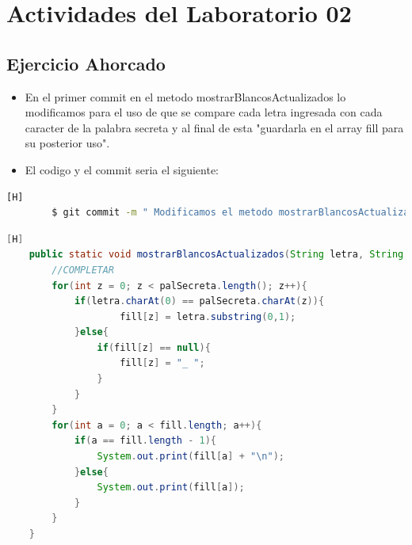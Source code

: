 \documentclass{article}
\begin{document}
	\section{Actividades del Laboratorio 02}
	
	\subsection{Ejercicio Ahorcado}
	\begin{itemize}	
		\item En el primer commit en el metodo mostrarBlancosActualizados lo modificamos para el uso de que se compare cada letra ingresada con cada caracter de la palabra secreta y al final de esta "guardarla en el array fill para su posterior uso".
		\item El codigo y el commit seria el siguiente:
	\end{itemize}	
	\begin{lstlisting}[language=bash,caption={Commit}][H]
		$ git commit -m " Modificamos el metodo mostrarBlancosActualizados y completamos el metodo letraEnPalabraSecreta y agregamos un Mensaje de perdio y cuantos intentos uso"
	\end{lstlisting}	
	\begin{lstlisting}[language=java,caption={Las lineas de codigos del metodo modificado:}][H]
    public static void mostrarBlancosActualizados(String letra, String palSecreta, String[] fill){ // Agregamos al dominio un string y un string[] para su funcionamiento del metodo
        //COMPLETAR 
        for(int z = 0; z < palSecreta.length(); z++){
            if(letra.charAt(0) == palSecreta.charAt(z)){
                    fill[z] = letra.substring(0,1);
            }else{
                if(fill[z] == null){
                    fill[z] = "_ ";
                }
            }
        }
        for(int a = 0; a < fill.length; a++){
            if(a == fill.length - 1){
                System.out.print(fill[a] + "\n");
            }else{
                System.out.print(fill[a]);
            }
        }
    }
	\end{lstlisting}
\end{document}
